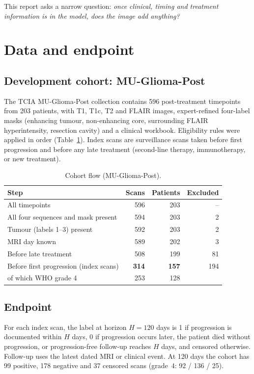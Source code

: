 \documentclass[11pt,a4paper]{article}
\begin{document}
This report asks a narrow question: \emph{once clinical, timing and treatment information is in the model, does the
image add anything?}

\section{Data and endpoint}

\subsection{Development cohort: MU-Glioma-Post}
The TCIA MU-Glioma-Post collection contains 596 post-treatment timepoints from 203 patients, with T1, T1c, T2 and
FLAIR images, expert-refined four-label masks (enhancing tumour, non-enhancing core, surrounding FLAIR hyperintensity,
resection cavity) and a clinical workbook. Eligibility rules were applied in order (Table~\ref{tab:flow}). Index scans
are surveillance scans taken before first progression and before any late treatment (second-line therapy,
immunotherapy, or new treatment).

\begin{table}[h]
\centering
\caption{Cohort flow (MU-Glioma-Post).}
\label{tab:flow}
\begin{tabular}{lrrr}
\toprule
Step & Scans & Patients & Excluded \\
\midrule
All timepoints & 596 & 203 & -- \\
All four sequences and mask present & 594 & 203 & 2 \\
Tumour (labels 1--3) present & 592 & 203 & 2 \\
MRI day known & 589 & 202 & 3 \\
Before late treatment & 508 & 199 & 81 \\
Before first progression (index scans) & \textbf{314} & \textbf{157} & 194 \\
\quad of which WHO grade 4 & 253 & 128 & \\
\bottomrule
\end{tabular}
\end{table}

\subsection{Endpoint}
For each index scan, the label at horizon $H = 120$ days is 1 if progression is documented within $H$ days, 0 if
progression occurs later, the patient died without progression, or progression-free follow-up reaches $H$ days, and
censored otherwise. Follow-up uses the latest dated MRI or clinical event. At 120 days the cohort has 99 positive,
178 negative and 37 censored scans (grade~4: 92 / 136 / 25).
\end{document}
